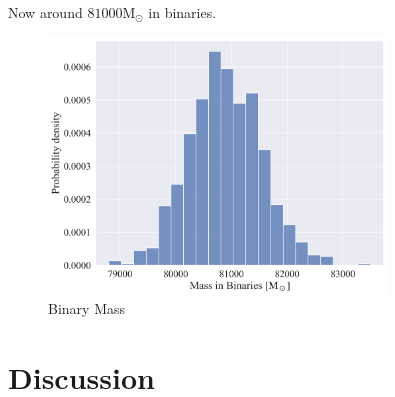 Now around $81000 \mathrm{M}_\odot$ in binaries.

\begin{figure}
	\centering
	\includegraphics[width=0.8\textwidth]{figures/high_bin_model/binary_mass.png}
	\caption{Binary Mass}
	\label{fig:high_bin_model_Bin_mass}
\end{figure}





\section{Discussion}








